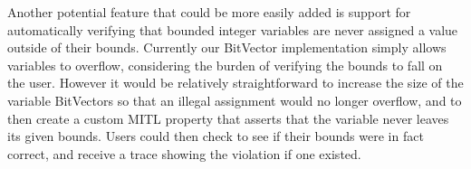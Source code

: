 \documentclass[a4paper,11pt]{report}
\theoremstyle{definition}
\begin{document}
Another potential feature that could be more easily added is support for
automatically verifying that bounded integer variables are never assigned a
value outside of their bounds. Currently our BitVector implementation simply
allows variables to overflow, considering the burden of verifying the bounds to
fall on the user. However it would be relatively straightforward to increase the
size of the variable BitVectors so that an illegal assignment would no longer
overflow, and to then create a custom MITL property that asserts that the
variable never leaves its given bounds. Users could then check to see if their
bounds were in fact correct, and receive a trace showing the violation if one
existed.

\newpage



\end{document}
